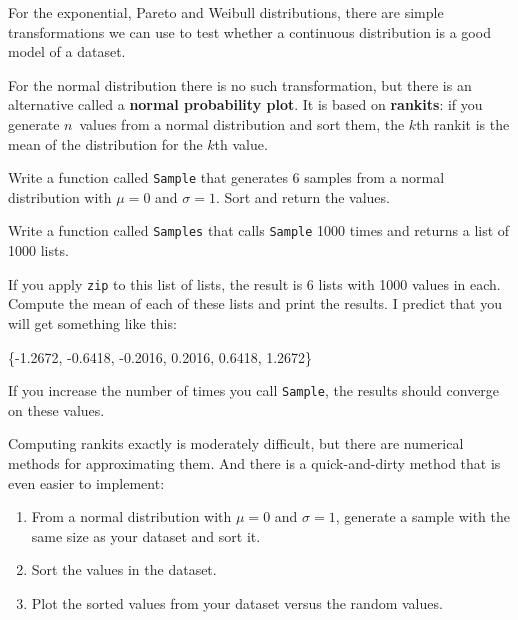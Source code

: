 \documentclass[12pt]{book}
\begin{document}
For the exponential, Pareto and Weibull distributions, there are
simple transformations we can use to test whether a continuous
distribution is a good model of a dataset.

For the normal distribution there is no such transformation, but there
is an alternative called a {\bf normal probability plot}.  It is based
on {\bf rankits}: if you generate $n$~values from a normal
distribution and sort them, the $k$th rankit is the mean of the
distribution for the $k$th value.

\begin{exercise}
Write a function called {\tt Sample} that generates 6 samples from a
normal distribution with $\mu = 0$ and $\sigma = 1$.  Sort and return
the values.

Write a function called {\tt Samples} that calls {\tt Sample} 1000 times and
returns a list of 1000 lists.

If you apply {\tt zip} to this list of lists, the result is 6 lists
with 1000 values in each.  Compute the mean of each of these lists
and print the results.  I predict that you will get something like
this:

\{-1.2672,   -0.6418,   -0.2016,   0.2016,   0.6418,   1.2672\}

If you increase the number of times you call {\tt Sample}, the
results should converge on these values.

\end{exercise}


Computing rankits exactly is moderately difficult, but there are
numerical methods for approximating them.  And there is a
quick-and-dirty method that is even easier to implement:

\begin{enumerate}

\item From a normal distribution with $\mu = 0$ and $\sigma = 1$,
generate a sample with the same size as your dataset and sort it.

\item Sort the values in the dataset.

\item Plot the sorted values from your dataset versus the random values.

\end{enumerate}
\end{document}
